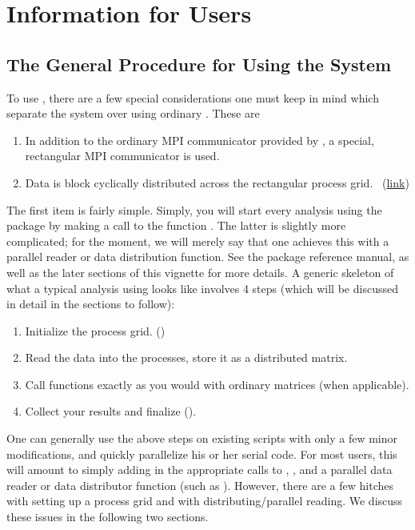 \section[]{Information for Users}

\subsection[]{The General Procedure for Using the System}\label{sec:basic_steps}

To use , there are a few special considerations one must keep in mind which separate the system over using ordinary .  These are
\begin{enumerate}
 \item In addition to the ordinary MPI communicator provided by , a special, rectangular MPI communicator is used.~\citep{blug}
 \item Data is block cyclically distributed across the rectangular process grid.~\citep{slug} (\href{http://netlib.org/scalapack/slug/node75.html}{link})
\end{enumerate}

The first item is fairly simple.  Simply, you will start every analysis using the  package by making a call to the function .  The latter is slightly more complicated; for the moment, we will merely say that one achieves this with a parallel reader or data distribution function.  See the package reference manual, as well as the later sections of this vignette for more details.
\np
A generic skeleton of what a typical analysis using  looks like involves 4 steps (which will be discussed in detail in the sections to follow):

\begin{enumerate}
\item Initialize the process grid. ()
\item Read the data into the processes, store it as a distributed matrix.
\item Call  functions exactly as you would with ordinary matrices (when applicable).
\item Collect your results and finalize ().
\end{enumerate}

One can generally use the above steps on existing  scripts with only a few minor modifications, and
quickly parallelize his or her serial code.   For most users, this will amount to simply adding in the appropriate calls to , , and a parallel data reader or data distributor function (such as ).  However, there are a few hitches with setting up a process grid and with distributing/parallel reading.  We discuss these issues in the following two sections.

